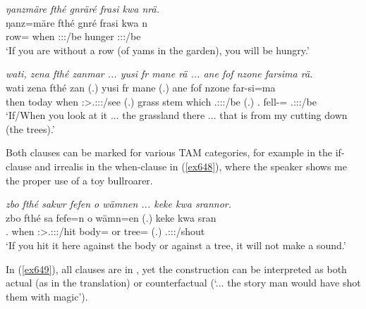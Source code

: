 \begin{exe}
	\ex \emph{ŋanzmäre fthé gnräré frasi kwa nrä.}\\
	\gll ŋanz=märe fthé gnré frasi kwa n\\
	row={\Priv} when \Ssg:\Sbj:\Imp:\Ipfv/be hunger {\Fut} \Ssg:\Sbj:\Nonpast:\Ipfv/be\\
	\trans `If you are without a row (of yams in the garden), you will be hungry.'\\
	\label{ex646}
\end{exe}
\begin{exe}
	\ex \emph{wati, zena fthé zanmar ... yusi fr mane rä ... ane fof nzone farsima rä.}\\
	\gll wati zena fthé zan (.) yusi fr mane  (.) ane fof nzone far-si=ma \\
	then today when \Ssg:\Sbj>\Tsg.\F:\Obj:\Imp:\Pfv/see (.) grass stem which \Tsg.\F:\Sbj:\Nonpast:\Ipfv/be (.) {\Dem} {\Emph} \Fsg.{\Poss} fell-\Nmlz={\Char} \Tsg.\F:\Sbj:\Nonpast:\Ipfv/be\\
	\trans `If/When you look at it ... the grassland there ... that is from my cutting down (the trees).'
	\label{ex647}
\end{exe}

Both clauses can be marked for various TAM categories, for example  in the if-clause and irrealis in the when-clause in (\ref{ex648}), where the speaker shows me the proper use of a toy bullroarer.

\begin{exe}
	\ex \emph{zbo fthé sakwr fefen o wämnen ... keke kwa srannor.}\\
	\gll zbo fthé sa fefe=n o wämn=en (.) keke kwa sran\\
	\Prox.{\All} when \Ssg:\Sbj>\Tsg.\Masc:\Obj:\Imp:\Pfv/hit body={\Loc} or tree={\Loc} (.) {\Neg} {\Fut} \Tsg.\Masc:\Sbj:\Irr:\Ipfv/shout\\
	\trans `If you hit it here against the body or against a tree, it will not make a sound.'\\
	\label{ex648}
\end{exe}

In (\ref{ex649}), all clauses are in  , yet the  construction can be interpreted as both actual (as in the translation) or counterfactual (`... the story man would have shot them with magic').

